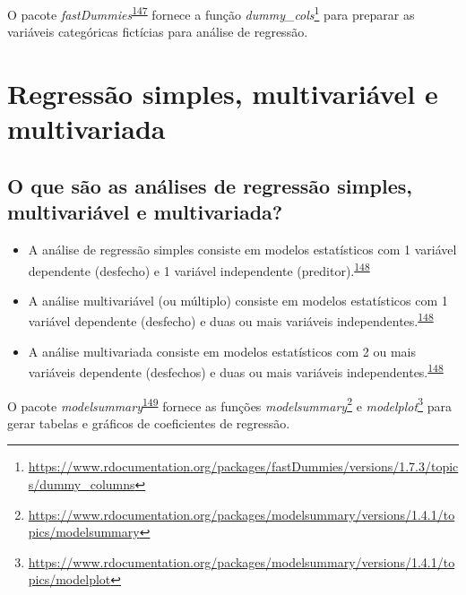 \documentclass[
]{book}
\renewcommand{\href}[2]{#2\footnote{\url{#1}}}
\newenvironment{infobox}[1]
  {
  \begin{itemize}
  \renewcommand{\labelitemi}{
    \raisebox{-.7\height}[0pt][0pt]{
      {\setkeys{Gin}{width=3em,keepaspectratio}
        \texttt{[image: \#1]}}
    }
  }
  \setlength{\fboxsep}{1em}
  \begin{blackbox}
  \item
  }
  {
  \end{blackbox}
  \end{itemize}
  }
\begin{document}
\begin{infobox}{images/Rlogo}
O pacote \emph{fastDummies}\textsuperscript{\protect\hyperlink{ref-fastDummies}{147}} fornece a função \href{https://www.rdocumentation.org/packages/fastDummies/versions/1.7.3/topics/dummy_columns}{\emph{dummy\_cols}} para preparar as variáveis categóricas fictícias para análise de regressão.

\end{infobox}

\hypertarget{multivariavel-multivariada}{%
\section{Regressão simples, multivariável e multivariada}\label{multivariavel-multivariada}}

\hypertarget{o-que-suxe3o-as-anuxe1lises-de-regressuxe3o-simples-multivariuxe1vel-e-multivariada}{%
\subsection{O que são as análises de regressão simples, multivariável e multivariada?}\label{o-que-suxe3o-as-anuxe1lises-de-regressuxe3o-simples-multivariuxe1vel-e-multivariada}}

\begin{itemize}
\item
  A análise de regressão simples consiste em modelos estatísticos com 1 variável dependente (desfecho) e 1 variável independente (preditor).\textsuperscript{\protect\hyperlink{ref-Hidalgo2013}{148}}
\item
  A análise multivariável (ou múltiplo) consiste em modelos estatísticos com 1 variável dependente (desfecho) e duas ou mais variáveis independentes.\textsuperscript{\protect\hyperlink{ref-Hidalgo2013}{148}}
\item
  A análise multivariada consiste em modelos estatísticos com 2 ou mais variáveis dependente (desfechos) e duas ou mais variáveis independentes.\textsuperscript{\protect\hyperlink{ref-Hidalgo2013}{148}}
\end{itemize}

\begin{infobox}{images/Rlogo}
O pacote \emph{modelsummary}\textsuperscript{\protect\hyperlink{ref-modelsummary}{149}} fornece as funções \href{https://www.rdocumentation.org/packages/modelsummary/versions/1.4.1/topics/modelsummary}{\emph{modelsummary}} e \href{https://www.rdocumentation.org/packages/modelsummary/versions/1.4.1/topics/modelplot}{\emph{modelplot}} para gerar tabelas e gráficos de coeficientes de regressão.

\end{infobox}
\end{document}

